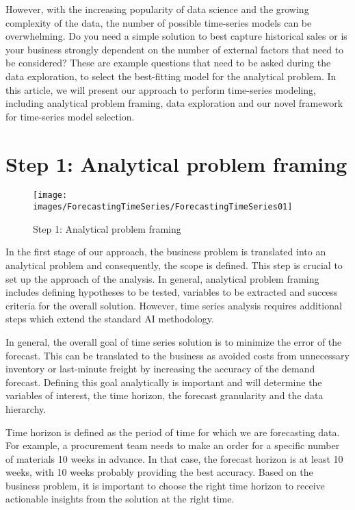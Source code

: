 However, with the increasing popularity of data science and the growing complexity of the data, the number of possible time-series models can be overwhelming. Do you need a simple solution to best capture historical sales or is your business strongly dependent on the number of external factors that need to be considered? These are example questions that need to be asked during the data exploration, to select the best-fitting model for the analytical problem. In this article, we will present our approach to perform time-series modeling, including analytical problem framing, data exploration and our novel framework for time-series model selection.

\section{Step 1: Analytical problem framing}

\begin{figure}
    \texttt{[image: images/ForecastingTimeSeries/ForecastingTimeSeries01]}
    \caption{Step 1: Analytical problem framing} \label{ForecastingTimeSeries01}
\end{figure}


In the first stage of our approach, the business problem is translated into an analytical problem and consequently, the scope is defined. This step is crucial to set up the approach of the analysis. In general, analytical problem framing includes defining hypotheses to be tested, variables to be extracted and success criteria for the overall solution. However, time series analysis requires additional steps which extend the standard AI methodology.

In general, the overall goal of time series solution is to minimize the error of the forecast. This can be translated to the business as avoided costs from unnecessary inventory or last-minute freight by increasing the accuracy of the demand forecast. Defining this goal analytically is important and will determine the variables of interest, the time horizon, the forecast granularity and the data hierarchy.

Time horizon is defined as the period of time for which we are forecasting data. For example, a procurement team needs to make an order for a specific number of materials 10 weeks in advance. In that case, the forecast horizon is at least 10 weeks, with 10 weeks probably providing the best accuracy. Based on the business problem, it is important to choose the right time horizon to receive actionable insights from the solution at the right time.

